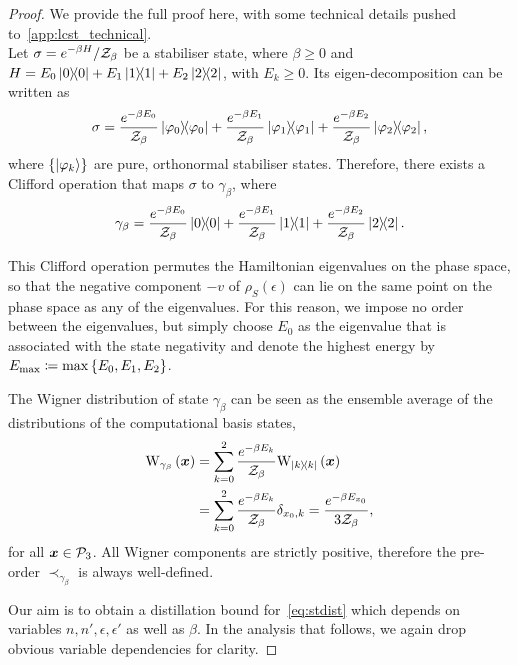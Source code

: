 \documentclass[pra,
aps,
twocolumn,
superscriptaddress,
groupedaddress,
nofootinbib,
reprint
]{revtex4-1}
\begin{document}
\begin{proof}
	We provide the full proof here, with some technical details pushed to~\cref{app:lcst_technical}.\\

Let $\displaystyle \sigma = e^{-\beta H} / \mathcal{Z}_\beta$ be a stabiliser state, where $\beta \geq 0$ and $H = E_0 \ketbra{0} + E_1 \ketbra{1} + E_2 \ketbra{2}$, with $E_k \geq 0$.
Its eigen-decomposition can be written as 
\begin{equation}
	\sigma = \frac{e^{-\beta E_0}}{\mathcal{Z}_\beta} \ketbra{\varphi_0} + \frac{e^{-\beta E_1}}{\mathcal{Z}_\beta} \ketbra{\varphi_1} + \frac{e^{-\beta E_2}}{\mathcal{Z}_\beta} \ketbra{\varphi_2},
\end{equation}
where $\{\ket{\varphi_k}\}$ are pure, orthonormal stabiliser states. 
Therefore, there exists a Clifford operation that maps $\sigma$ to $\gamma_\beta$, where 
\begin{equation}
\gamma_\beta = \frac{e^{-\beta E_0}}{\mathcal{Z}_\beta} \ketbra{0} + \frac{e^{-\beta E_1}}{\mathcal{Z}_\beta} \ketbra{1} + \frac{e^{-\beta E_2}}{\mathcal{Z}_\beta} \ketbra{2}.
\end{equation}

This Clifford operation permutes the Hamiltonian eigenvalues on the phase space, so that the negative component $-v$ of $\rho_S(\epsilon)$ can lie on the same point on the phase space as any of the eigenvalues.
For this reason, we impose no order between the eigenvalues, but simply choose $E_0$ as the eigenvalue that is associated with the state negativity and denote the highest energy by $E_{\rm{max}} \coloneqq \max{\{E_0, E_1, E_2\}}$.

The Wigner distribution of state $\gamma_\beta$ can be seen as the ensemble average of the distributions of the computational basis states,
\begin{align}
	\W[\bmx]{\gamma_\beta} &= \sum\limits_{k=0}^2 \frac{e^{-\beta E_k}}{\Z_\beta}\W[\bmx]{\ketbra{k}} \\
	&= \sum\limits_{k=0}^2 \frac{e^{-\beta E_k}}{\Z_\beta} \delta_{x_0, k} = \frac{e^{-\beta E_{x_0}}}{3\Z_\beta},
\end{align}
for all $\bm{x} \in \mathcal{P}_3$. 
All Wigner components are strictly positive, therefore the pre-order $\prec_{\gamma_\beta}$ is always well-defined.

Our aim is to obtain a distillation bound for~\cref{eq:stdist} which depends on variables $n, n', \epsilon, \epsilon'$ as well as $\beta$.
In the analysis that follows, we again drop obvious variable dependencies for clarity.


\end{proof}
\end{document}
